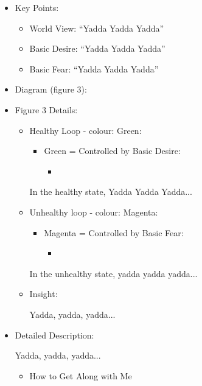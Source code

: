\documentclass[openleft,oneside,showtrims]{memoir}
\begin{document}
\begin{itemize}
\item Key Points:
\label{sec:orgf6b933a}
\begin{itemize}
\item World View: ``Yadda Yadda Yadda''
\item Basic Desire: ``Yadda Yadda Yadda''
\item Basic Fear: ``Yadda Yadda Yadda''
\end{itemize}

\item Diagram (figure 3):
\label{sec:org9191ef4}

\item Figure 3 Details:
\label{sec:org228ec54}

\begin{itemize}
\item Healthy Loop - colour: Green:
\label{sec:org10fc1d9}

\begin{itemize}
\item Green = Controlled by Basic Desire:
\begin{itemize}
\item 
\end{itemize}
\end{itemize}

In the healthy state, Yadda Yadda Yadda...

\item Unhealthy loop - colour: Magenta:
\label{sec:orged4c93b}

\begin{itemize}
\item Magenta = Controlled by Basic Fear:

\begin{itemize}
\item 
\end{itemize}
\end{itemize}

In the unhealthy state, yadda yadda yadda...

\item Insight:
\label{sec:org26b4179}

Yadda, yadda, yadda...
\end{itemize}

\item Detailed Description:
\label{sec:org0f24727}

Yadda, yadda, yadda...

\begin{itemize}
\item How to Get Along with Me
\label{sec:org67ed92c}


\end{itemize}
\end{itemize}
\end{document}
